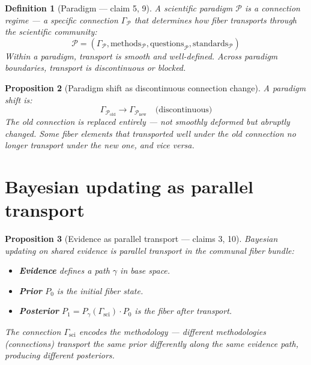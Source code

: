 \documentclass[11pt,a4paper]{article}
\newtheorem{definition}{Definition}[section]
\newtheorem{proposition}[definition]{Proposition}
\begin{document}
\begin{definition}[Paradigm --- claim 5, 9]
A \emph{scientific paradigm} $\mathcal{P}$ is a connection regime ---
a specific connection $\Gamma_{\mathcal{P}}$ that determines how fiber
transports through the scientific community:
\[
  \mathcal{P} = (\Gamma_{\mathcal{P}}, \text{methods}_{\mathcal{P}},
    \text{questions}_{\mathcal{P}}, \text{standards}_{\mathcal{P}})
\]
Within a paradigm, transport is smooth and well-defined. Across paradigm
boundaries, transport is discontinuous or blocked.
\end{definition}

\begin{proposition}[Paradigm shift as discontinuous connection change]
\label{prop:shift}
A paradigm shift is:
\[
  \Gamma_{\mathcal{P}_{\text{old}}} \to \Gamma_{\mathcal{P}_{\text{new}}}
  \quad \text{(discontinuous)}
\]
The old connection is replaced entirely --- not smoothly deformed but
abruptly changed. Some fiber elements that transported well under the
old connection no longer transport under the new one, and vice versa.
\end{proposition}

\section{Bayesian updating as parallel transport}

\begin{proposition}[Evidence as parallel transport --- claims 3, 10]
\label{prop:bayes}
Bayesian updating on shared evidence is parallel transport in the
communal fiber bundle:
\begin{itemize}
  \item \textbf{Evidence} defines a path $\gamma$ in base space.
  \item \textbf{Prior} $P_0$ is the initial fiber state.
  \item \textbf{Posterior} $P_1 = P_\gamma(\Gamma_{\text{sci}}) \cdot P_0$
    is the fiber after transport.
\end{itemize}
The connection $\Gamma_{\text{sci}}$ encodes the methodology ---
different methodologies (connections) transport the same prior differently
along the same evidence path, producing different posteriors.
\end{proposition}


\end{document}
